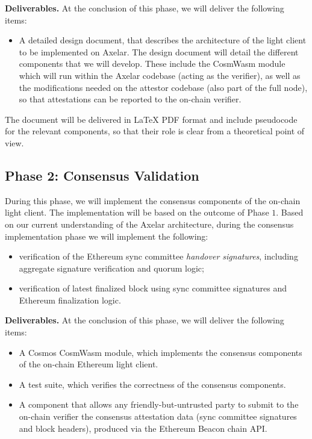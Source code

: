 \noindent
\textbf{Deliverables.} At the conclusion of this phase, we will deliver the following items:

\begin{itemize}
    \item A detailed design document, that describes the architecture of the light client to be implemented on Axelar. The design document will detail the different components that we will develop. These include the CosmWasm module which will run within the Axelar codebase (acting as the verifier), as well as the modifications needed on the attestor codebase (also part of the full node), so that attestations can be reported to the on-chain verifier.
\end{itemize}

The document will be delivered in LaTeX PDF format and include pseudocode for the relevant components, so that their role is clear from a theoretical point of view.

\subsection{Phase 2: Consensus Validation}

During this phase, we will implement the consensus components of the on-chain light client. The implementation will be based on the outcome of Phase $1$. Based on our current understanding of the Axelar architecture, during the consensus implementation phase we will implement the following:
\begin{itemize}
    \item verification of the Ethereum sync committee \emph{handover signatures}, including aggregate signature verification and quorum logic;
    \item verification of latest finalized block using sync committee signatures and Ethereum finalization logic.
\end{itemize}

\noindent
\textbf{Deliverables.} At the conclusion of this phase, we will deliver the following items:

\begin{itemize}
    \item A Cosmos CosmWasm module, which implements the consensus components of the on-chain Ethereum light client.
    \item A test suite, which verifies the correctness of the consensus components.
    \item A component that allows any friendly-but-untrusted party to submit to the on-chain verifier the consensus attestation data (sync committee signatures and block headers), produced via the Ethereum Beacon chain API.
\end{itemize}

